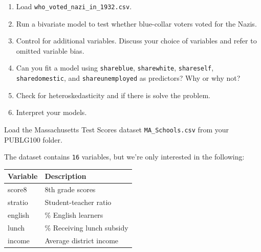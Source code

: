 \documentclass[]{article}
\providecommand{\tightlist}{%
  \setlength{\itemsep}{0pt}\setlength{\parskip}{0pt}}
\theoremstyle{definition}
\theoremstyle{definition}
\theoremstyle{definition}
\theoremstyle{remark}
\begin{document}
\begin{enumerate}
\def\labelenumi{\arabic{enumi}.}
\setcounter{enumi}{7}
\tightlist
\item
  Load \texttt{who\_voted\_nazi\_in\_1932.csv}.
\item
  Run a bivariate model to test whether blue-collar voters voted for the
  Nazis.
\item
  Control for additional variables. Discuss your choice of variables and
  refer to omitted variable bias.
\item
  Can you fit a model using \texttt{shareblue}, \texttt{sharewhite},
  \texttt{shareself}, \texttt{sharedomestic}, and
  \texttt{shareunemployed} as predictors? Why or why not?
\item
  Check for heteroskedasticity and if there is solve the problem.
\item
  Interpret your models.
\end{enumerate}

Load the Massachusetts Test Scores dataset \texttt{MA\_Schools.csv} from
your PUBLG100 folder.

The dataset contains \texttt{16} variables, but we're only interested in
the following:

\begin{longtable}[]{@{}ll@{}}
\toprule
Variable & Description\tabularnewline
\midrule
\endhead
score8 & 8th grade scores\tabularnewline
stratio & Student-teacher ratio\tabularnewline
english & \% English learners\tabularnewline
lunch & \% Receiving lunch subsidy\tabularnewline
income & Average district income\tabularnewline
\bottomrule
\end{longtable}
\end{document}
